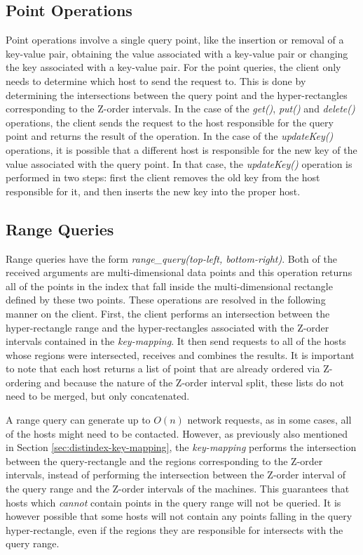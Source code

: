\documentclass[11pt,a4paper]{globis-book}
\begin{document}
\subsection{Point Operations}
Point operations involve a single query point, like the insertion or removal of a key-value pair, obtaining the value associated with a key-value pair or changing the key associated with a key-value pair. For the point queries, the client only needs to determine which host to send the request to. This is done by determining the intersections between the query point and the hyper-rectangles corresponding to the Z-order intervals. In the case of the \textit{get()}, \textit{put()} and \textit{delete()} operations, the client sends the request to the host responsible for the query point and returns the result of the operation. In the case of the \textit{updateKey()} operations, it is possible that a different host is responsible for the new key of the value associated with the query point. In that case, the \textit{updateKey()} operation is performed in two steps: first the client removes the old key from the host responsible for it, and then inserts the new key into the proper host.

\subsection{Range Queries}

Range queries have the form \textit{range\_query(top-left, bottom-right)}. Both of the received arguments are multi-dimensional data points and this operation returns all of the points in the index that fall inside the multi-dimensional rectangle defined by these two points. These operations are resolved in the following manner on the client. First, the client performs an intersection between the hyper-rectangle range and the hyper-rectangles associated with the Z-order intervals contained in the \textit{key-mapping}. It then send requests to all of the hosts whose regions were intersected, receives and combines the results. It is important to note that each host returns a list of point that are already ordered via Z-ordering and because the nature of the Z-order interval split, these lists do not need to be merged, but only concatenated.

A range query can generate up to $O(n)$ network requests, as in some cases, all of the hosts might need to be contacted. However, as previously also mentioned in Section \ref{sec:distindex-key-mapping}, the \textit{key-mapping} performs the intersection between the query-rectangle and the regions corresponding to the Z-order intervals, instead of performing the intersection between the Z-order interval of the query range and the Z-order intervals of the machines. This guarantees that hosts which \textit{cannot} contain points in the query range will not be queried. It is however possible that some hosts will not contain any points falling in the query hyper-rectangle, even if the regions they are responsible for intersects with the query range.
\end{document}

